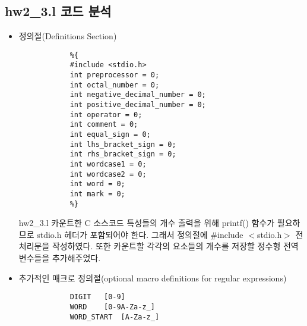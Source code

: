 \documentclass{article}
\begin{document}
\subsection{hw2\_3.l 코드 분석}
\begin{itemize}
	\item 정의절(Definitions Section)	
		\begin{lstlisting}
			%{
			#include <stdio.h>
			int preprocessor = 0;
			int octal_number = 0;
			int negative_decimal_number = 0;
			int positive_decimal_number = 0;
			int operator = 0;
			int comment = 0;
			int equal_sign = 0;
			int lhs_bracket_sign = 0;
			int rhs_bracket_sign = 0;
			int wordcase1 = 0;
			int wordcase2 = 0;
			int word = 0;
			int mark = 0;
			%}
		\end{lstlisting}
		hw2\_3.l 카운트한 C 소스코드 특성들의 개수 출력을 위해 printf() 함수가 필요하므로 stdio.h
		헤더가 포함되어야 한다. 그래서 정의절에 \#include $<$stdio.h$>$ 전처리문을 작성하였다.
		또한 카운트할 각각의 요소들의 개수를 저장할 정수형 전역 변수들을 추가해주었다.
	\item 추가적인 매크로 정의절(optional macro definitions for regular expressions)
		\begin{lstlisting}
			DIGIT	[0-9]
			WORD	[0-9A-Za-z_]
			WORD_START	[A-Za-z_]

\end{lstlisting}
\end{itemize}
\end{document}
